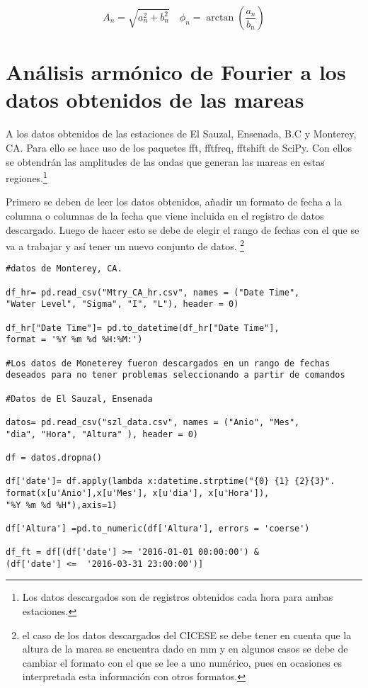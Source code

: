 $$A_{n}={\sqrt{a_{n}^{2}+b_{n}^{2}}}\quad \phi_{n}=\arctan\left(\frac{a_{n}}{b_{n}}\right)$$

\section{Análisis armónico de Fourier a los datos obtenidos de las mareas}
A los datos obtenidos de las estaciones de El Sauzal, Ensenada, B.C y Monterey, CA. Para ello se hace uso de los paquetes \textsf{fft, fftfreq, fftshift} de \textsf{SciPy}. Con ellos se obtendrán las amplitudes de las ondas que generan las mareas en estas regiones.\footnote{Los datos descargados son de registros obtenidos cada hora para ambas estaciones.}

Primero se deben de leer los datos obtenidos, añadir un formato de fecha a la columna o columnas de la fecha que viene incluida en el registro de datos descargado. Luego de hacer esto se debe de elegir el rango de fechas con el que se va a trabajar y así tener un nuevo conjunto de datos. \footnote{\footnotesize el caso de los datos descargados del CICESE se debe tener en cuenta que la altura de la marea se encuentra dado en mm y en algunos casos se debe de cambiar el formato con el que se lee a uno numérico, pues en ocasiones es interpretada esta información con otros formatos.}


\begin{verbatim}
#datos de Monterey, CA.

df_hr= pd.read_csv("Mtry_CA_hr.csv", names = ("Date Time", 
"Water Level", "Sigma", "I", "L"), header = 0)

df_hr["Date Time"]= pd.to_datetime(df_hr["Date Time"], 
format = '%Y %m %d %H:%M:')

#Los datos de Moneterey fueron descargados en un rango de fechas 
deseados para no tener problemas seleccionando a partir de comandos

#Datos de El Sauzal, Ensenada

datos= pd.read_csv("szl_data.csv", names = ("Anio", "Mes", 
"dia", "Hora", "Altura" ), header = 0)

df = datos.dropna()

df['date']= df.apply(lambda x:datetime.strptime("{0} {1} {2}{3}".
format(x[u'Anio'],x[u'Mes'], x[u'dia'], x[u'Hora']), 
"%Y %m %d %H"),axis=1)

df['Altura'] =pd.to_numeric(df['Altura'], errors = 'coerse')

df_ft = df[(df['date'] >= '2016-01-01 00:00:00') & 
(df['date'] <=  '2016-03-31 23:00:00')]
\end{verbatim}

